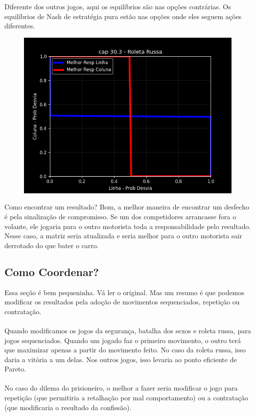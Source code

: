 \documentclass[a4paper,11pt,oneside]{book}
\theoremstyle{definition}
\theoremstyle{break}
\begin{document}
Diferente dos outros jogos, aqui os equilíbrios são nas opções contrárias. Os equilíbrios de Nash de estratégia pura estão nas opções onde eles seguem ações diferentes.

\begin{figure}[H]
\centering
\includegraphics[scale=0.75]{cap30_3-jogos_coordenacao_3.png}
\end{figure}

Como encontrar um resultado? Bom, a melhor maneira de encontrar um desfecho é pela sinalização de compromisso. Se um dos competidores arrancasse fora o volante, ele jogaria para o outro motorista toda a responsabilidade pelo resultado. Nesse caso, a matriz seria atualizada e seria melhor para o outro motorista sair derrotado do que bater o carro.

\subsection{Como Coordenar?}

Essa seção é bem pequeninha. Vá ler o original. Mas um resumo é que podemos modificar os resultados pela adoção de movimentos sequenciados, repetição ou contratação.
\\~\\
Quando modificamos os jogos da segurança, batalha dos sexos e roleta russa, para jogos sequenciados. Quando um jogado faz o primeiro movimento, o outro terá que maximizar apenas a partir do movimento feito. No caso da roleta russa, isso daria a vitória a um delas. Nos outros jogos, isso levaria ao ponto eficiente de Pareto.
\\~\\
No caso do dilema do prisioneiro, o melhor a fazer seria modificar o jogo para repetição (que permitiria a retalhação por mal comportamento) ou a contratação (que modificaria o resultado da confissão). 
\end{document}
